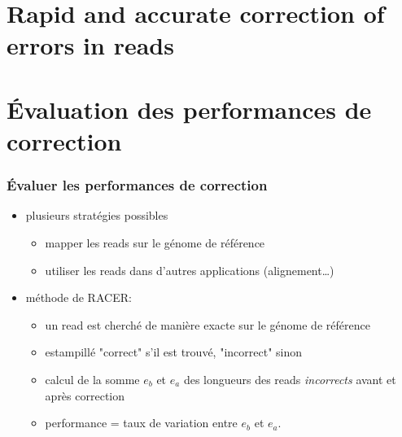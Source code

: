 \documentclass{beamer}
\begin{document}
\section{Rapid and accurate correction of errors in reads}


\section{Évaluation des performances de correction}
\begin{frame}
\frametitle{Évaluer les performances de correction}
\begin{itemize}
    \item plusieurs stratégies possibles
    \begin{itemize}
        \item mapper les reads sur le génome de référence
        \item utiliser les reads dans d'autres applications (alignement\dots)
    \end{itemize}
    \item méthode de RACER:
    \begin{itemize}
        \item un read est cherché de manière exacte sur le génome de référence
        \item estampillé "correct" s'il est trouvé, "incorrect" sinon
        \item calcul de la somme $e_b$ et $e_a$ des longueurs des reads {\em incorrects} avant et après correction
        \item performance = taux de variation entre $e_b$ et $e_a$.
    \end{itemize}
\end{itemize}
\end{frame}
\end{document}
